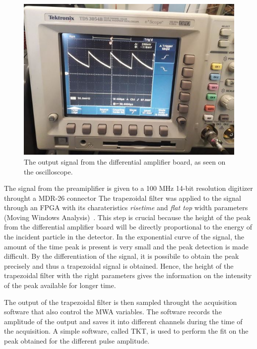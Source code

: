 \bigbreak

\begin{figure}[h]
  \centering
  \includegraphics[scale=.35]{img/test_signal_oscilloscope.JPG}
  \caption{The output signal from the differential amplifier board, as seen on the oscilloscope.}
  \label{osc}
\end{figure}

\bigbreak

The signal from the preamiplifier is given to a 100 MHz 14-bit resolution digitizer throught a MDR-26 connector
The trapezoidal filter was applied to the signal through an FPGA with its charateristics \emph{risetime} and \emph{flat top} width parameters (Moving Windows Analysis)~\cite{salathe}. This step is crucial because the height of the peak from the differential amplifier board will be directly proportional to the energy of the incident particle in the detector. In the exponential curve of the signal, the amount of the time peak is present is very small and the peak detection is made difficult. By the differentiation of the signal, it is possibile to obtain the peak precisely and thus a trapezoidal signal is obtained. 
Hence, the height of the trapezoidal filter with the right parameters gives the information on the intensity of the peak available for longer time.

\bigbreak

The output of the trapezoidal filter is then sampled throught the acquisition software that also control the MWA variables. The software records the amplitude of the output and saves it into different channels during the time of the acquisition. A simple software, called TKT, is used to perform the fit on the peak obtained for the different pulse amplitude. 

